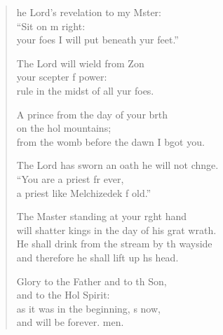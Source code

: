 \settowidth{\versewidth}{will shatter kings in the day of his great wrath.}
\begin{verse}%
  \begin{patverse}
he Lord’s revelation to my Mster:\Flex\\
“Sit on m right:\Med\\
your foes I will put beneath yur feet.”

The Lord will wield from Z\pointup{\i}on\Flex\\
your scepter f power:\Med\\
rule in the midst of all yur foes.

A prince from the day of your b\pointup{\i}rth\Flex\\
on the hol mountains;\Med\\
from the womb before the dawn I bgot you.

The Lord has sworn an oath he will not chnge.\Flex\\
“You are a priest fr ever,\Med\\
a priest like Melchizedek f old.”

The Master standing at your r\pointup{\i}ght hand\Med\\
will shatter kings in the day of his grat wrath.\\
He shall drink from the stream by th wayside\Med\\
and therefore he shall lift up h\pointup{\i}s head.

Glory to the Father and to th Son,\Med\\
and to the Hol Spirit:\\
as it was in the beginning, \pointup{\i}s now,\Med\\
and will be forever. men.
  \end{patverse}
\end{verse}
